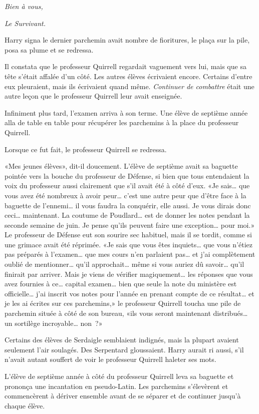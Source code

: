 \emph{Bien à vous,}

\emph{Le Survivant.}

Harry signa le dernier parchemin avait nombre de fioritures, le plaça sur la pile, posa sa plume et se redressa.

Il constata que le professeur Quirrell regardait vaguement vers lui, mais que sa tête s'était affalée d'un côté. Les autres élèves écrivaient encore. Certains d'entre eux pleuraient, mais ils écrivaient quand même. \emph{Continuer de combattre} était une autre leçon que le professeur Quirrell leur avait enseignée.

Infiniment plus tard, l'examen arriva à son terme. Une élève de septième année alla de table en table pour récupérer les parchemins à la place du professeur Quirrell.

Lorsque ce fut fait, le professeur Quirrell se redressa.

«Mes jeunes élèves», dit-il doucement. L'élève de septième avait sa baguette pointée vers la bouche du professeur de Défense, si bien que tous entendaient la voix du professeur aussi clairement que s'il avait été à côté d'eux. «Je sais… que vous avez été nombreux à avoir peur… c'est une autre peur que d'être face à la baguette de l'ennemi… il vous faudra la conquérir, elle aussi. Je vous dirais donc ceci… maintenant. La coutume de Poudlard… est de donner les notes pendant la seconde semaine de juin. Je pense qu'ils peuvent faire une exception… pour moi.» Le professeur de Défense eut son sourire sec habituel, mais il se tordit, comme si une grimace avait été réprimée. «Je sais que vous êtes inquiets… que vous n'étiez pas préparés à l'examen… que mes cours n'en parlaient pas… et j'ai complètement oublié de mentionner… qu'il approchait… même si vous auriez dû savoir… qu'il finirait par arriver. Mais je viens de vérifier magiquement… les réponses que vous avez fournies à ce… capital examen… bien que seule la note du ministère est officielle… j'ai inscrit vos notes pour l'année en prenant compte de ce résultat… et je les ai écrites sur ces parchemins,» le professeur Quirrell toucha une pile de parchemin située à côté de son bureau, «ils vous seront maintenant distribués… un sortilège incroyable… non~?»

Certains des élèves de Serdaigle semblaient indignés, mais la plupart avaient seulement l'air soulagés. Des Serpentard gloussaient. Harry aurait ri aussi, s'il n'avait autant souffert de voir le professeur Quirrell haleter ses mots.

L'élève de septième année à côté du professeur Quirrell leva sa baguette et prononça une incantation en pseudo-Latin. Les parchemins s'élevèrent et commencèrent à dériver ensemble avant de se séparer et de continuer jusqu'à chaque élève.

